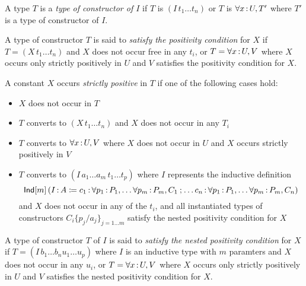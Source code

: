 \documentclass{article}
\begin{document}
\begin{definition}
A type $T$ is a \emph{type of constructor of $I$} if $T$ is $(I\, t_1 \ldots t_n)$ or
$T$ is $\forall x {\,:\,} U , T'$ where $T'$ is a type of constructor of $I$.
\end{definition}

\begin{definition}
A type of constructor $T$ is said to \emph{satisfy the positivity condition} for
$X$ if $T = (X\, t_1 \ldots t_n)$ and $X$ does not occur free in any $t_i$, or
$T = \forall x {\,:\,} U , V$ where $X$ occurs only strictly positively in $U$ and
$V$ satisfies the positivity condition for $X$.
\end{definition}
\begin{definition}
A constant $X$ occurs \emph{strictly positive} in $T$ if one of the following
cases hold:
\begin{itemize}
\item $X$ does not occur in $T$
\item $T$ converts to $(X\, t_1 \ldots t_n)$ and $X$ does not occur in any $T_i$
\item $T$ converts to $\forall x {\,:\,} U , V$ where $X$ does not occur in $U$ and
  $X$ occurs strictly positively in $V$
\item $T$ converts to $(I\, a_1\ldots a_m\, t_1\ldots t_p)$ where $I$ represents
  the inductive definition
  \[\mathsf{Ind}[m]\left(I {\,:\,} A \coloneqq c_1 {\,:\,} \forall p_1 {\,:\,} P_1, \ldots \forall p_m {\,:\,} P_m, C_1
    \mathbin{;} \ldots c_n {\,:\,} \forall p_1 {\,:\,} P_1, \ldots \forall p_m {\,:\,} P_m, C_n\right)
  \]
  and $X$ does not occur in any of the $t_i$, and all instantiated types of
  constructors $C_i\{p_j/a_j\}_{j=1\ldots m}$ satisfy the nested positivity
  condition for $X$
\end{itemize}
\end{definition}
\begin{definition}
A type of constructor $T$ of $I$ is said to \emph{satisfy the nested positivity
  condition} for $X$ if $T = (I\, b_1 \ldots b_n u_1 \ldots u_p)$ where $I$ is
an inductive type with $m$ paramters and $X$ does not occur in any $u_i$, or
$T = \forall x {\,:\,} U , V$ where $X$ occurs only strictly positively in $U$ and $V$
satisfies the nested positivity condition for $X$.
\end{definition}
\end{document}
